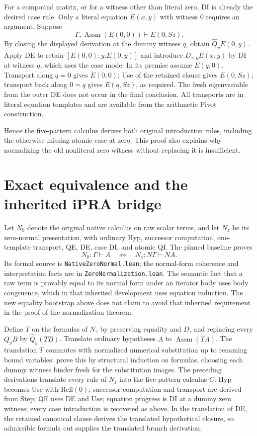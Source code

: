 For a compound matrix, or for a witness other than literal zero, DI is
already the desired case rule. Only a literal equation $E(x,y)$ with
witness $0$ requires an argument. Suppose
\[
 \Gamma,\operatorname{Assm}(E(0,0))\vdash E(0,Sz).
\]
By closing the displayed derivation at the dummy witness $q$, obtain
$\widehat Q_y E(0,y)$. Apply DE to retain
$[E(0,0);y.E(0,y)]$ and introduce $D_{x,y}E(x,y)$ by DI at witness
$q$, which uses the case mode. In its premise assume $E(q,0)$.
Transport along $q=0$ gives $E(0,0)$; Use of the retained clause gives
$E(0,Sz)$; transport back along $0=q$ gives $E(q,Sz)$, as required.
The fresh eigenvariable from the outer DE does not occur in the final
conclusion. All transports are in literal equation templates and are
available from the arithmetic Pivot construction.

Hence the five-pattern calculus derives both original introduction
rules, including the otherwise missing atomic case at zero. This proof
also explains why normalizing the old nonliteral zero witness without
replacing it is insufficient.

\section{Exact equivalence and the inherited iPRA bridge}
\label{sec:uniform-step-equivalence}

Let $N_0$ denote the original native calculus on raw scalar terms, and
let $N_z$ be its zero-normal presentation, with ordinary Hyp, successor
computation, one-template transport, QE, DE, case DI, and atomic QI.
The pinned baseline proves
\[
 N_0:\Gamma\vdash A
 \quad\Longleftrightarrow\quad
 N_z:N\Gamma\vdash NA.
\]
Its formal source is \texttt{NativeZeroNormal.lean}; the normal-form
coherence and interpretation facts are in
\texttt{ZeroNormalization.lean}. The semantic fact that a raw term
is provably equal to its normal form under an iterator body uses
body congruence, which in that inherited development uses equation
induction. The new equality bootstrap above does not claim to avoid
that inherited requirement in the proof of the normalization theorem.

Define $T$ on the formulas of $N_z$ by preserving equality and $D$,
and replacing every $Q_yB$ by $\widehat Q_y(TB)$. Translate ordinary
hypotheses $A$ to $\operatorname{Assm}(TA)$. The translation $T$
commutes with normalized numerical substitution up to renaming bound
variables: prove this by structural induction on formulas, choosing
each dummy witness binder fresh for the substitution images.
The preceding derivations
translate every rule of $N_z$ into the five-pattern calculus $C$:
Hyp becomes Use with Refl$(0)$; successor computation and transport
are derived from Step; QE uses DE and Use; equation progress is DI
at a dummy zero witness; every case introduction is recovered as
above. In the translation of DE, the retained canonical clause derives
the translated hypothetical closure, so admissible formula cut supplies
the translated branch derivation.

